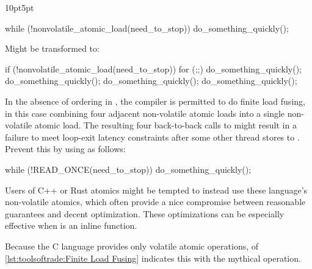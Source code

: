 \begin{description}[labelsep=.4em]
\begin{listing}[tb]
\begin{adjustwidth}{10pt}{5pt}
\footnotesize
\begin{fcvlabel}
\renewcommand{\myfvline}{A\arabic{FancyVerbLine}}
\begin{VerbatimT}[commandchars=\\\[\]]
while (!nonvolatile_atomic_load(need_to_stop))  \lnlbl[A1]
	do_something_quickly();			\lnlbl[A2]
\end{VerbatimT}
Might be transformed to:
\renewcommand{\myfvline}{B\arabic{FancyVerbLine}}
\begin{VerbatimT}[commandchars=\\\[\]]
if (!nonvolatile_atomic_load(need_to_stop))	\lnlbl[B1]
	for (;;) {				\lnlbl[B2]
		do_something_quickly();		\lnlbl[B3]
		do_something_quickly();		\lnlbl[B4]
		do_something_quickly();		\lnlbl[B5]
		do_something_quickly();		\lnlbl[B6]
	}					\lnlbl[B7]
\end{VerbatimT}
In the absence of ordering in , the compiler is
permitted to do finite load fusing, in this case combining four adjacent
non-volatile atomic loads into a single non-volatile atomic load.
The resulting four back-to-back calls to 
might result in a failure to meet loop-exit latency constraints after
some other thread stores to .
Prevent this by using  as follows:
\renewcommand{\myfvline}{C\arabic{FancyVerbLine}}
\begin{VerbatimT}[commandchars=\\\[\]]
while (!READ_ONCE(need_to_stop))	\lnlbl[C1]
	do_something_quickly();		\lnlbl[C2]
\end{VerbatimT}
\end{fcvlabel}
\end{adjustwidth}
\caption{Finite Load Fusing}
\label{lst:toolsoftrade:Finite Load Fusing}
\end{listing}

Users of C++ or Rust atomics might be tempted to instead use these
language's non-volatile atomics, which often provide a nice compromise
between reasonable guarantees and decent optimization.
These optimizations can be especially effective when
 is an inline function.
\begin{fcvref}
Because the C language provides only volatile atomic operations,
 of
\cref{lst:toolsoftrade:Finite Load Fusing}
indicates this with the mythical  operation.


\end{fcvref}
\end{description}
